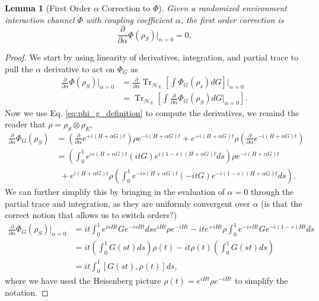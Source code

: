 \documentclass{article}
\newtheorem{lemma}[theorem]{Lemma}
\newcommand{\parens}[1]{\left( #1 \right)}
\newcommand{\brackets}[1]{\left[ #1 \right]}
\DeclareMathOperator{\Tr}{Tr}
\newcommand{\partrace}[2]{\Tr_{#1} \brackets{ #2 }}
\begin{document}
\begin{lemma}[First Order $\alpha$ Correction to $\Phi$]
   Given a randomized environment interaction channel $\Phi$ with coupling coefficient $\alpha$, the first order correction is
   \begin{equation}
        \frac{\partial}{\partial \alpha} \Phi(\rho_S) \bigg|_{\alpha = 0} = 0.
   \end{equation}
\end{lemma}
\begin{proof}
    We start by using linearity of derivatives, integration, and partial trace to pull the $\alpha$ derivative to act on $\Phi_G$ as
    \begin{align}
        \frac{\partial}{\partial \alpha} \Phi(\rho_S) \bigg|_{\alpha = 0} &= \frac{\partial}{\partial \alpha} \partrace{\mathcal{H}_E}{\int \Phi_G(\rho_s) dG} \bigg|_{\alpha = 0} \\
         &= \partrace{\mathcal{H}_E}{\int \frac{\partial}{\partial \alpha} \Phi_G(\rho_S) dG \bigg|_{\alpha = 0} } .
    \end{align}
    Now we use Eq. \eqref{eq:phi_g_definition} to compute the derivatives, we remind the reader that $\rho = \rho_S \otimes \rho_E$,
    \begin{align}
        \frac{\partial}{\partial \alpha} \Phi_G (\rho_S) &= \parens{\frac{\partial}{\partial \alpha} e^{+ i (H + \alpha G)t}} \rho e^{-i (H + \alpha G) t} + e^{+i (H + \alpha G)t} \rho \parens{\frac{\partial}{\partial \alpha} e^{- i (H + \alpha G)t}} \\
        &= \parens{\int_{0}^{1} e^{i s (H+\alpha G)t} (i t G) e^{i (1-s) (H+\alpha G)t} ds} \rho e^{-i(H+\alpha G)t} \nonumber \\
    &~ ~+ e^{i(H+\alpha G)t} \rho \parens{\int_{0}^1 e^{-i s (H+\alpha G) t} (- i t G) e^{-i (1-s) (H+\alpha G)t} ds}. \label{eq:first_order_alpha_derivative}
    \end{align}
    We can further simplify this by bringing in the evaluation of $\alpha = 0$ through the partial trace and integration, as they are uniformly convergent over $\alpha$ (is that the correct notion that allows us to switch orders?)
    \begin{align}
        \frac{\partial}{\partial \alpha} \Phi_G(\rho_S) \bigg|_{\alpha = 0} &= i t \int_0^1 e^{i s H t} G e^{-i s H t} ds e^{i H t} \rho e^{-i H t} - i t e^{+i H t} \rho \int_0^1 e^{-is H t} G e^{-i(1-s) Ht} ds \\
        &= i t \parens{\int_0^1 G(s t) ds} \rho(t) - it \rho(t) \parens{\int_0^1 G(s t) ds} \\
        &= i t \int_0^1 [G(s t), \rho(t)] ds,
    \end{align}
    where we have used the Heisenberg picture $\rho(t) = e^{i H t} \rho e^{-i H t}$ to simplify the notation.


\end{proof}
\end{document}
